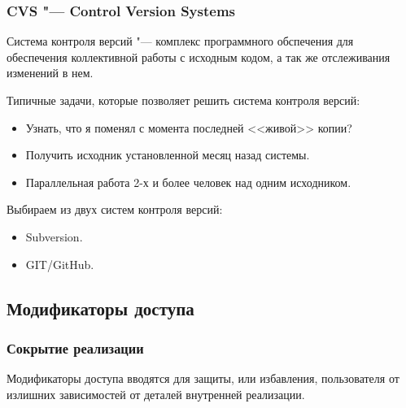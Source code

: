 \documentclass[default]{beamer}
\begin{document}
	\begin{frame}
		\frametitle{CVS "--- Control Version Systems}
		Система контроля версий "--- комплекс программного обспечения для обеспечения коллективной работы с исходным кодом, а так же отслеживания изменений в нем.
		
		Типичные задачи, которые позволяет решить система контроля версий:
		
		\begin{itemize}
			\item Узнать, что я поменял с момента последней <<живой>> копии?
			\item Получить исходник установленной месяц назад системы.
			\item Параллельная работа 2-х и более человек над одним исходником.
		\end{itemize}
		
		Выбираем из двух систем контроля версий:
		\begin{itemize}
			\item Subversion.
			\item GIT/GitHub.
		\end{itemize}
	\end{frame}

	\subsection{Модификаторы доступа}
	\begin{frame}
		\frametitle{Сокрытие реализации}
		
		Модификаторы доступа вводятся для защиты, или избавления, пользователя от излишних зависимостей от деталей внутренней реализации.
		\begin{overlayarea}{\textwidth}{0.7\textheight}
			\only<1>{
				\lstPubHum	
			}
			\only<2>{
				\lstPrivHum
			}
		\end{overlayarea}
	\end{frame}
\end{document}
